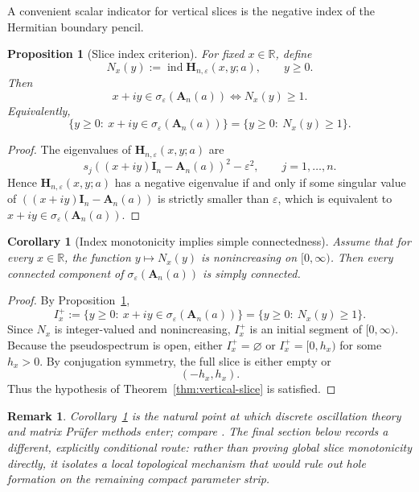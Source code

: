 \documentclass[11pt]{article}
\newtheorem{proposition}[theorem]{Proposition}
\newtheorem{corollary}[theorem]{Corollary}
\newtheorem{remark}[theorem]{Remark}
\DeclareMathOperator{\ind}{ind}
\newcommand{\R}{\mathbb{R}}
\begin{document}
A convenient scalar indicator for vertical slices is the negative index of the Hermitian boundary pencil.

\begin{proposition}[Slice index criterion]\label{prop:slice-index}
For fixed \(x\in\R\), define
\[
N_x(y):=\ind \mathbf H_{n,\varepsilon}(x,y;a),
\qquad y\ge 0.
\]
Then
\[
x+iy\in \sigma_\varepsilon(\mathbf A_n(a))
\iff
N_x(y)\ge 1.
\]
Equivalently,
\[
\{y\ge 0:\ x+iy\in \sigma_\varepsilon(\mathbf A_n(a))\}
=
\{y\ge 0:\ N_x(y)\ge 1\}.
\]
\end{proposition}

\begin{proof}
The eigenvalues of \(\mathbf H_{n,\varepsilon}(x,y;a)\) are
\[
s_j((x+iy)\mathbf I_n-\mathbf A_n(a))^2-\varepsilon^2,
\qquad j=1,\dots,n.
\]
Hence \(\mathbf H_{n,\varepsilon}(x,y;a)\) has a negative eigenvalue if and only if some singular value of \(((x+iy)\mathbf I_n-\mathbf A_n(a))\) is strictly smaller than \(\varepsilon\), which is equivalent to \(x+iy\in \sigma_\varepsilon(\mathbf A_n(a))\).
\end{proof}

\begin{corollary}[Index monotonicity implies simple connectedness]\label{cor:index-monotone}
Assume that for every \(x\in\R\), the function \(y\mapsto N_x(y)\) is nonincreasing on \([0,\infty)\). Then every connected component of \(\sigma_\varepsilon(\mathbf A_n(a))\) is simply connected.
\end{corollary}

\begin{proof}
By Proposition~\ref{prop:slice-index},
\[
I_x^+:=\{y\ge 0:\ x+iy\in \sigma_\varepsilon(\mathbf A_n(a))\}
=
\{y\ge 0:\ N_x(y)\ge 1\}.
\]
Since \(N_x\) is integer-valued and nonincreasing, \(I_x^+\) is an initial segment of \([0,\infty)\). Because the pseudospectrum is open, either \(I_x^+=\varnothing\) or \(I_x^+=[0,h_x)\) for some \(h_x>0\). By conjugation symmetry, the full slice is either empty or
\[
(-h_x,h_x).
\]
Thus the hypothesis of Theorem~\ref{thm:vertical-slice} is satisfied.
\end{proof}

\begin{remark}
Corollary~\ref{cor:index-monotone} is the natural point at which discrete oscillation theory and matrix Pr\"ufer methods enter; compare \cite{Hilscher2012,KratzHilscher2013,SchulzBaldes2007}. The final section below records a different, explicitly conditional route: rather than proving global slice monotonicity directly, it isolates a local topological mechanism that would rule out hole formation on the remaining compact parameter strip.
\end{remark}
\end{document}
